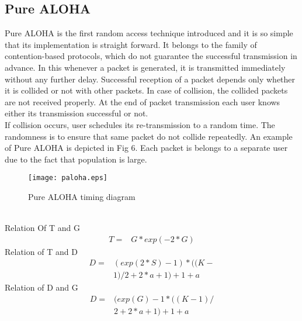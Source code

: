 \documentclass[10pt, conference, compsocconf]{IEEEtran}
\begin{document}
\subsection{Pure ALOHA}
Pure ALOHA is the first random access technique introduced and it is so simple that its implementation is straight forward. It belongs to the family of contention-based protocols, which do not guarantee the successful transmission in advance. In this whenever a packet is generated, it is transmitted immediately without any further delay. Successful reception of a packet depends only whether it is collided or not with other packets. In case of collision, the collided packets are not received properly. At the end of packet transmission each user knows either its transmission successful or not.
\\
\indent If collision occurs, user schedules its re-transmission to a random time. The randomness is to ensure that same packet do not collide repeatedly. An example of Pure ALOHA is depicted in Fig 6. Each packet is belongs to a separate user due to the fact that population is large.
\begin{figure}[!h]
\centering
\caption{Pure ALOHA timing diagram}
\texttt{[image: paloha.eps]}
\end{figure}
\\
Relation Of T and G
\begin{eqnarray}
T=&G*exp(-2*G)
\end{eqnarray}
Relation of T and D
\begin{eqnarray}
D=&(exp(2*S)-1)*((K- \nonumber\\
&1)/2+2*a+1)+1+a
\end{eqnarray}
Relation of D and G
\begin{eqnarray}
D=&(exp(G)-1*((K-1)/ \nonumber\\
&2+2*a+1)+1+a
\end{eqnarray}
\end{document}
